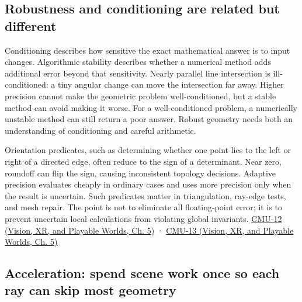 \subsection{Robustness and conditioning are related but different}\label{04-visual-computing-ii-ch029-robustness-and-conditioning-are-related-but-different}

Conditioning describes how sensitive the exact mathematical answer is to input changes. Algorithmic stability describes whether a numerical method adds additional error beyond that sensitivity. Nearly parallel line intersection is ill-conditioned: a tiny angular change can move the intersection far away. Higher precision cannot make the geometric problem well-conditioned, but a stable method can avoid making it worse. For a well-conditioned problem, a numerically unstable method can still return a poor answer. Robust geometry needs both an understanding of conditioning and careful arithmetic.

Orientation predicates, such as determining whether one point lies to the left or right of a directed edge, often reduce to the sign of a determinant. Near zero, roundoff can flip the sign, causing inconsistent topology decisions. Adaptive precision evaluates cheaply in ordinary cases and uses more precision only when the result is uncertain. Such predicates matter in triangulation, ray-edge tests, and mesh repair. The point is not to eliminate all floating-point error; it is to prevent uncertain local calculations from violating global invariants. \href{../07-Vision-XR-and-Playable-Worlds/main.pdf\#nameddest=04-visual-computing-ii-ch036-cmu-12---geometric-queries}{CMU-12 (Vision, XR, and Playable Worlds, Ch. 5)} · \href{../07-Vision-XR-and-Playable-Worlds/main.pdf\#nameddest=04-visual-computing-ii-ch036-cmu-13---spatial-data-structures}{CMU-13 (Vision, XR, and Playable Worlds, Ch. 5)}

\subsection{Acceleration: spend scene work once so each ray can skip most geometry}\label{04-visual-computing-ii-ch029-acceleration-spend-scene-work-once-so-each-ray-can-skip-most-geometry}

